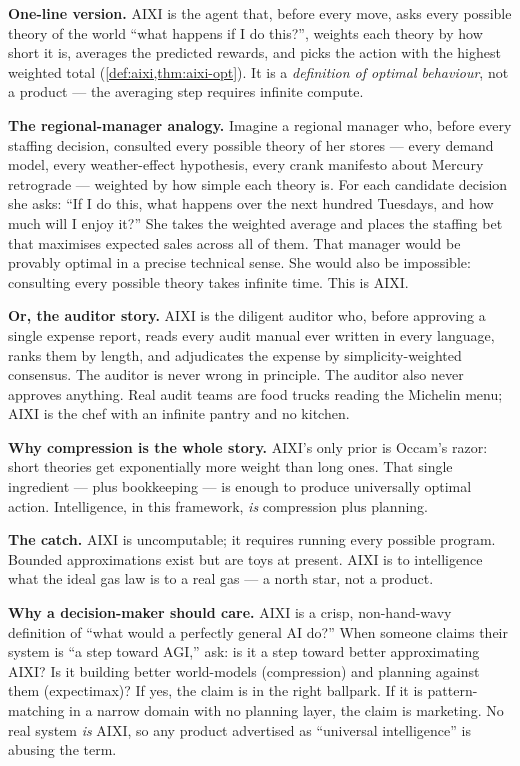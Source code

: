 \begin{intuition}
\textbf{One-line version.}  AIXI is the agent that, before every move,
asks every possible theory of the world ``what happens if I do this?'',
weights each theory by how short it is, averages the predicted rewards,
and picks the action with the highest weighted total
(\cref{def:aixi,thm:aixi-opt}).  It is a \emph{definition of optimal
behaviour}, not a product --- the averaging step requires infinite
compute.

\textbf{The regional-manager analogy.}  Imagine a regional manager who,
before every staffing decision, consulted every possible theory of her
stores --- every demand model, every weather-effect hypothesis, every
crank manifesto about Mercury retrograde --- weighted by how simple
each theory is.  For each candidate decision she asks: ``If I do this,
what happens over the next hundred Tuesdays, and how much will I enjoy
it?''  She takes the weighted average and places the staffing bet that
maximises expected sales across all of them.  That manager would be
provably optimal in a precise technical sense.  She would also be
impossible: consulting every possible theory takes infinite time.
This is AIXI.

\textbf{Or, the auditor story.}  AIXI is the diligent auditor who,
before approving a single expense report, reads every audit manual
ever written in every language, ranks them by length, and adjudicates
the expense by simplicity-weighted consensus.  The auditor is never
wrong in principle.  The auditor also never approves anything.  Real
audit teams are food trucks reading the Michelin menu; AIXI is the
chef with an infinite pantry and no kitchen.

\textbf{Why compression is the whole story.}  AIXI's only prior is
Occam's razor: short theories get exponentially more weight than long
ones.  That single ingredient --- plus bookkeeping --- is enough to
produce universally optimal action.  Intelligence, in this framework,
\emph{is} compression plus planning.

\textbf{The catch.}  AIXI is uncomputable; it requires running every
possible program.  Bounded approximations exist but are toys at
present.  AIXI is to intelligence what the ideal gas law is to a real
gas --- a north star, not a product.

\textbf{Why a decision-maker should care.}  AIXI is a crisp,
non-hand-wavy definition of ``what would a perfectly general AI do?''
When someone claims their system is ``a step toward AGI,'' ask: is it
a step toward better approximating AIXI?  Is it building better
world-models (compression) and planning against them (expectimax)?  If
yes, the claim is in the right ballpark.  If it is pattern-matching in
a narrow domain with no planning layer, the claim is marketing.  No
real system \emph{is} AIXI, so any product advertised as ``universal
intelligence'' is abusing the term.
\end{intuition}

